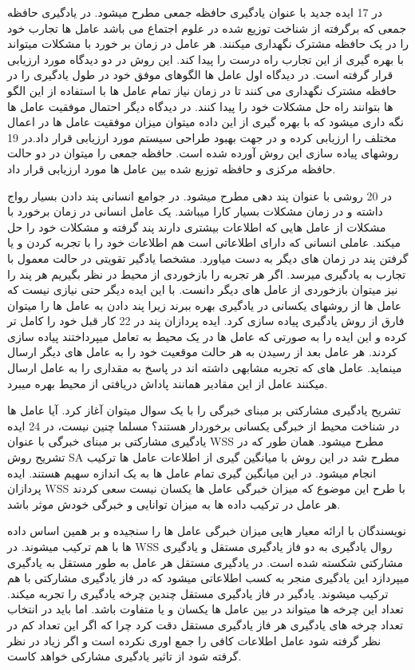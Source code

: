 در 17 ایده جدید با عنوان یادگیری حافظه جمعی مطرح میشود. در یادگیری حافظه جمعی که برگرفته از شناخت توزیع شده در علوم اجتماع می باشد عامل ها تجارب خود را در یک حافظه مشترک نگهداری میکنند. هر عامل در زمان بر خورد با مشکلات میتواند با بهره گیری از این تجارب راه درست را پیدا کند.
این روش در دو دیدگاه مورد ارزیابی قرار گرفته است. در دیدگاه اول عامل ها الگوهای موفق خود در طول یادگیری را در حافظه مشترک نگهداری می کنند تا در زمان نیاز تمام عامل ها با استفاده از این الگو ها بتوانند راه حل مشکلات خود را پیدا کنند. در دیدگاه دیگر احتمال موفقیت عامل ها نگه داری میشود که با بهره گیری از این داده میتوان میزان موفقیت عامل ها در اعمال مختلف را ارزیابی کرده و در جهت بهبود طراحی سیستم مورد ارزیابی قرار داد.در 19 روشهای پیاده سازی این روش آورده شده است. حافظه جمعی را میتوان در دو حالت حافظه مرکزی و حافظه توزیع شده بین عامل ها مورد ارزیابی قرار داد.

در 20 روشی با عنوان پند دهی مطرح میشود. در جوامع انسانی پند دادن بسیار رواج داشته و در زمان مشکلات بسیار کارا میباشد. یک عامل انسانی در زمان برخورد با مشکلات از عامل هایی که اطلاعات بیشتری دارند پند گرفته و مشکلات خود را حل میکند. عاملی انسانی که دارای اطلاعاتی است هم اطلاعات خود را با تجربه کردن و یا گرفتن پند در زمان های دیگر به دست میاورد. مشخصا یادگیر تقویتی در حالت معمول با تجارب به یادگیری میرسد. اگر هر تجربه را بازخوردی از محیط در نظر بگیریم هر پند را نیز میتوان بازخوردی از عامل های دیگر دانست. با این ایده دیگر حتی نیازی نیست که عامل ها از روشهای یکسانی در یادگیری بهره ببرند زیرا پند دادن به عامل ها را میتوان فارق از روش یادگیری پیاده سازی کرد.
ایده پردازان پند در 22 کار قبل خود را کامل تر کرده و این ایده را به صورتی که عامل ها در یک محیط به تعامل میپرداختند پیاده سازی کردند. هر عامل بعد از رسیدن به هر حالت موقعیت خود را به عامل های دیگر ارسال مینماید. عامل های که تجربه مشابهی داشته اند در پاسخ به مقداری را به عامل ارسال میکنند عامل از این مقادیر همانند پاداش دریافتی از محیط بهره میبرد.

تشریح یادگیری مشارکتی بر مبنای خبرگی را با یک سوال میتوان آغاز کرد. آیا عامل ها در شناخت محیط از خبرگی یکسانی برخوردار هستند؟ مسلما چنین نیست، در 24 ایده یادگیری مشارکتی بر مبنای خبرگی با عنوان WSS مطرح میشود.
همان طور که در تشریح روش SA مطرح شد در این روش با میانگین گیری از اطلاعات عامل ها ترکیب انجام میشود. در این میانگین گیری تمام عامل ها به یک اندازه سهیم هستند. ایده پردازان WSS با طرح این موضوع که میزان خبرگی عامل ها یکسان نیست سعی کردند هر عامل در ترکیب داده ها به میزان توانایی و خبرگی خودش موثر باشد.

نویسندگان با ارائه معیار هایی میزان خبرگی عامل ها را سنجیده و بر همین اساس داده ها با هم ترکیب میشوند. در WSS روال یادگیری به دو فاز یادگیری مستقل و یادگیری مشارکتی شکسته شده است.
در یادگیری مستقل هر عامل به طور مستقل به یادگیری میپردازد این یادگیری منجر به کسب اطلاعاتی میشود که در فاز یادگیری مشارکتی با هم ترکیب میشوند. یادگیر در فاز یادگیری مستقل چندین چرخه یادگیری را تجربه میکند. تعداد این چرخه ها میتواند در بین عامل ها یکسان و یا متفاوت باشد. اما باید در انتخاب تعداد چرخه های یادگیری هر فاز یادگیری مستقل دقت کرد چرا که اگر این تعداد کم در نظر گرفته شود عامل اطلاعات کافی را جمع اوری نکرده است و اگر زیاد در نظر گرفته شود از تاثیر یادگیری مشارکی خواهد کاست.

